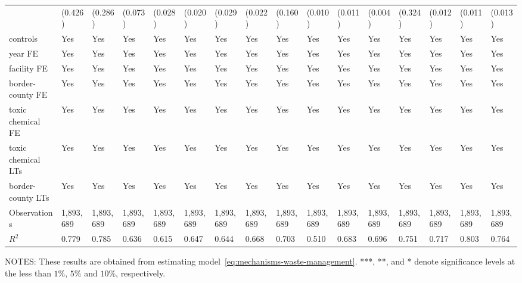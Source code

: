 \begin{table}[H]
{\begin{tabular}{@{}llllllllllllllll@{}}
            & (0.426)   & (0.286)   & (0.073)   & (0.028)    & (0.020)   & (0.029)   & (0.022)   & (0.160)         & (0.010)   & (0.011)  & (0.004)  & (0.324)  & (0.012)  & (0.011)       & (0.013)         \\
            controls           & Yes       & Yes       & Yes       & Yes        & Yes       & Yes       & Yes       & Yes             & Yes       & Yes       & Yes       & Yes       & Yes       & Yes            & Yes              \\
            year FE            & Yes       & Yes       & Yes       & Yes        & Yes       & Yes       & Yes       & Yes             & Yes       & Yes       & Yes       & Yes       & Yes       & Yes            & Yes              \\
            facility FE        & Yes       & Yes       & Yes       & Yes        & Yes       & Yes       & Yes       & Yes             & Yes       & Yes       & Yes       & Yes       & Yes       & Yes            & Yes              \\
            border-county FE   & Yes       & Yes       & Yes       & Yes        & Yes       & Yes       & Yes       & Yes             & Yes       & Yes       & Yes       & Yes       & Yes       & Yes            & Yes              \\
            toxic chemical FE  & Yes       & Yes       & Yes       & Yes        & Yes       & Yes       & Yes       & Yes             & Yes       & Yes       & Yes       & Yes       & Yes       & Yes            & Yes              \\
            toxic chemical LTs & Yes       & Yes       & Yes       & Yes        & Yes       & Yes       & Yes       & Yes             & Yes       & Yes       & Yes       & Yes       & Yes       & Yes            & Yes              \\
            border-county LTs  & Yes       & Yes       & Yes       & Yes        & Yes       & Yes       & Yes       & Yes             & Yes       & Yes       & Yes       & Yes       & Yes       & Yes            & Yes              \\ \midrule
            Observations       & 1,893,689 & 1,893,689 & 1,893,689 & 1,893,689  & 1,893,689 & 1,893,689 & 1,893,689 & 1,893,689       & 1,893,689 & 1,893,689 & 1,893,689 & 1,893,689 & 1,893,689 & 1,893,689      & 1,893,689        \\
            $R^2$              & 0.779     & 0.785     & 0.636     & 0.615      & 0.647     & 0.644     & 0.668     & 0.703           & 0.510     & 0.683     & 0.696     & 0.751     & 0.717    & 0.803         & 0.764           \\ \bottomrule \bottomrule
        \end{tabular}%
    }
    \begin{minipage}{\columnwidth}
        \vspace{0.05in}
        \tiny NOTES: These results are obtained from estimating model~\ref{eq:mechanisms-waste-management}. ***, **, and * denote significance levels at the less than $1\%$, $5\%$ and $10\%$, respectively.
    \end{minipage}
\end{table}